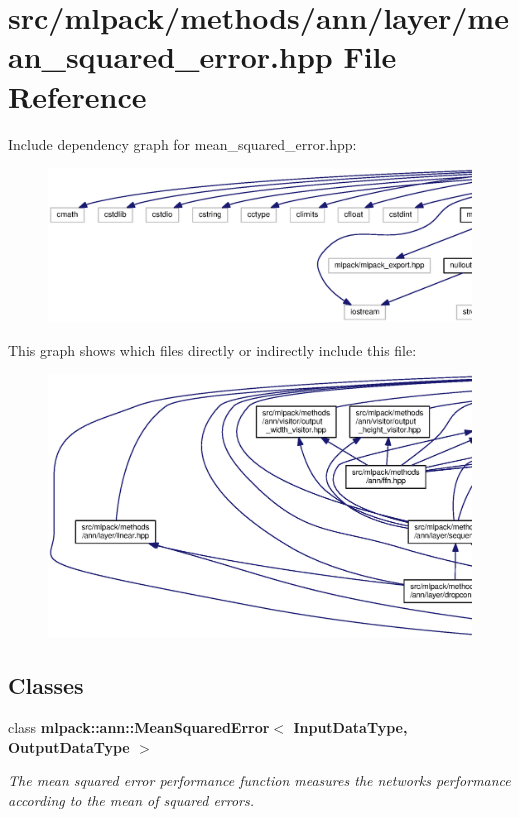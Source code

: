 \section{src/mlpack/methods/ann/layer/mean\+\_\+squared\+\_\+error.hpp File Reference}
\label{mean__squared__error_8hpp}
Include dependency graph for mean\+\_\+squared\+\_\+error.\+hpp\+:
\nopagebreak
\begin{figure}[H]
\begin{center}
\leavevmode
\includegraphics[width=350pt]{mean__squared__error_8hpp__incl}
\end{center}
\end{figure}
This graph shows which files directly or indirectly include this file\+:
\nopagebreak
\begin{figure}[H]
\begin{center}
\leavevmode
\includegraphics[width=350pt]{mean__squared__error_8hpp__dep__incl}
\end{center}
\end{figure}
\subsection*{Classes}
\begin{DoxyCompactItemize}
\item 
class {\bf mlpack\+::ann\+::\+Mean\+Squared\+Error$<$ Input\+Data\+Type, Output\+Data\+Type $>$}
\begin{DoxyCompactList}\small\item\em The mean squared error performance function measures the network\textquotesingle{}s performance according to the mean of squared errors. \end{DoxyCompactList}\end{DoxyCompactItemize}
